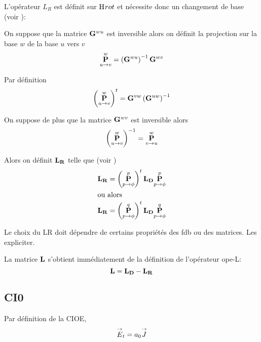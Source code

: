     L'opérateur \(L_R\) est définit sur \(\Hrot\) et nécessite donc un changement de base (voir \cite[(13)]{stupfel_implementation_2015}):

    \begin{defn}
      On suppose que la matrice \(\mG{w}{u}\) est inversible alors on définit la projection sur la base \(w\) de la base \(u\) vers \(v\)
      \begin{equation}
        \mP{u}{v}{w} = \left(\mG{w}{u}\right)^{-1}\mG{w}{v}
      \end{equation}
    \end{defn}

    \begin{prop}
      Par définition
      \begin{equation}
        \left(\mP{u}{v}{w}\right)^t = \mG{v}{w}\left(\mG{u}{w}\right)^{-1}
      \end{equation}
    \end{prop}

    \begin{prop}
      On suppose de plus que la matrice \(\mG{w}{v}\) est inversible alors
      \begin{equation}
        \left(\mP{u}{v}{w}\right)^{-1} = \mP{v}{u}{w}
      \end{equation}
    \end{prop}

    Alors on définit \(\mLR\) telle que (voir \cite{stupfel_implementation_2015})
    \begin{align}
      \mLR & = \left(\mP{p}{\phi}{p}\right)^t\mLD\mP{p}{\phi}{p} \\
      \intertext{ou alors}
      \mLR & = \left(\mP{p}{\phi}{q}\right)^t\mLD\mP{p}{\phi}{q} 
    \end{align}

    \begin{TODO}
      Le choix du LR doit dépendre de certains propriétés des fdb ou des matrices. Les expliciter.
    \end{TODO}

    La matrice \(\mL\) s’obtient immédiatement de la définition de l'opérateur \gls{ope-L}: 
    \begin{equation}
      \mL = \mLD - \mLR
    \end{equation}
        
    \subsection{CI0}
      Par définition de la CIOE,
      \begin{equation}
          \vE_t = a_0 \vJ
      \end{equation}

